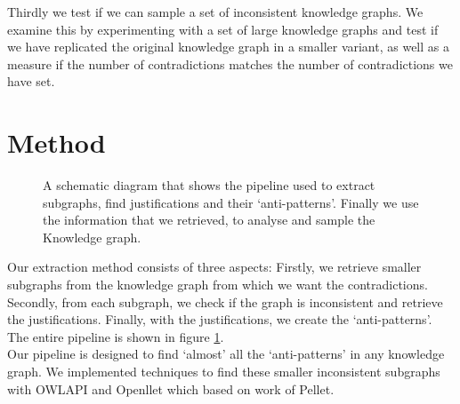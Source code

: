 \documentclass{article}
\begin{document}
Thirdly we test if we can sample a set of inconsistent knowledge graphs. We examine this by experimenting with a set of large knowledge graphs and test if we have replicated the original knowledge graph in a smaller variant, as well as a measure if the number of contradictions matches the number of contradictions we have set.

\newpage
\section{Method}
\begin{figure}[!t]
	\centering
	\caption{A schematic diagram that shows the pipeline used to extract subgraphs, find justifications and their `anti-patterns'. Finally 
		we use the information that we retrieved, to analyse and sample the Knowledge graph.}
	\label{fig:simplePipeline}
\end{figure}
Our extraction method consists of three aspects: Firstly, we retrieve smaller subgraphs from the knowledge graph from which we want the contradictions. Secondly, from each subgraph, we check if the graph is inconsistent and retrieve the justifications. Finally, with the justifications, we create the `anti-patterns'. The entire pipeline is shown in figure \ref{fig:simplePipeline}.\\
Our pipeline is designed to find `almost' all the `anti-patterns' in any knowledge graph. We implemented techniques to find these smaller inconsistent subgraphs with OWLAPI\cite{Horridge:2011} and Openllet\cite{Openllet:2019} which based on work of Pellet\cite{Pellet:2007}.\\
\end{document}
